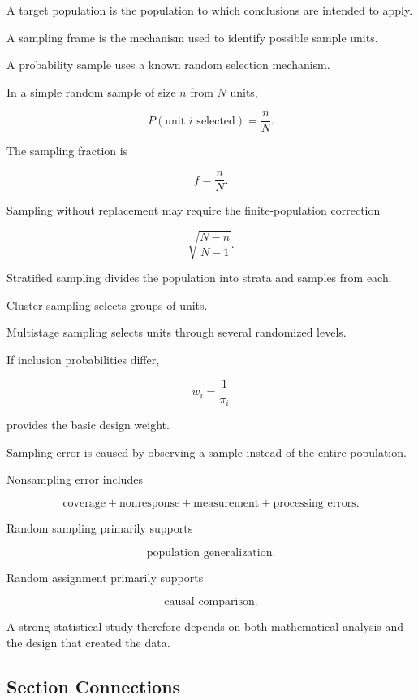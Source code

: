 A target population is the population to which conclusions are intended
to apply.

A sampling frame is the mechanism used to identify possible sample units.

A probability sample uses a known random selection mechanism.

In a simple random sample of size \(n\) from \(N\) units,

\[
\boxed{
P(\text{unit }i\text{ selected})
=
\frac nN.
}
\]

The sampling fraction is

\[
\boxed{
f=\frac nN.
}
\]

Sampling without replacement may require the finite-population
correction

\[
\boxed{
\sqrt{
\frac{N-n}{N-1}
}.
}
\]

Stratified sampling divides the population into strata and samples from
each.

Cluster sampling selects groups of units.

Multistage sampling selects units through several randomized levels.

If inclusion probabilities differ,

\[
\boxed{
w_i
=
\frac1{\pi_i}
}
\]

provides the basic design weight.

Sampling error is caused by observing a sample instead of the entire
population.

Nonsampling error includes

\[
\boxed{
\text{coverage}
+
\text{nonresponse}
+
\text{measurement}
+
\text{processing errors}.
}
\]

Random sampling primarily supports

\[
\boxed{
\text{population generalization}.
}
\]

Random assignment primarily supports

\[
\boxed{
\text{causal comparison}.
}
\]

A strong statistical study therefore depends on both mathematical
analysis and the design that created the data.

\subsection{Section Connections}
\label{subsec:data-collection-connections}

